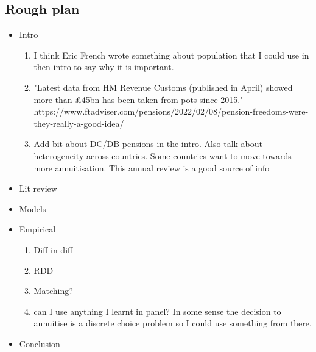 \documentclass[12pt]{article}
\begin{document}
\subsection{Rough plan}
\begin{itemize}
      \item Intro
            \begin{enumerate}
                  \item I think Eric French wrote something about population that I could use in then intro to say why it is important.
                  \item "Latest data from HM Revenue Customs (published in April) showed more than £45bn has been taken from pots since 2015."
                        https://www.ftadviser.com/pensions/2022/02/08/pension-freedoms-were-they-really-a-good-idea/


                  \item Add bit about DC/DB pensions in the intro. Also talk about heterogeneity across countries.
                        Some countries want to move towards more annuitisation. This annual review is a good source of info
                        \cite{banks_crawford_ar_2022}
            \end{enumerate}
      \item Lit review
      \item Models
      \item Empirical
            \begin{enumerate}
                  \item Diff in diff
                  \item RDD
                  \item Matching?
                  \item can I use anything I learnt in panel?
                        In some sense the decision to annuitise is a discrete choice problem so I could use something from there.
            \end{enumerate}
      \item Conclusion
\end{itemize}




\end{document}
